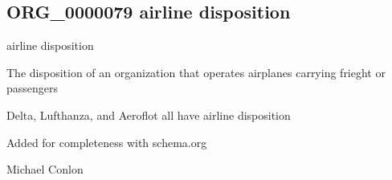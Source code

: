 \documentclass[letterpaper,10pt,english]{sphinxmanual}
\begin{document}
\subsection{ORG\_0000079 \sphinxhyphen{} airline disposition}
\label{\detokenize{doc-ORG_0000079:org-0000079-airline-disposition}}\label{\detokenize{doc-ORG_0000079:index-0}}\label{\detokenize{doc-ORG_0000079::doc}}
\begin{sphinxShadowBox}

\sphinxAtStartPar
airline disposition
\end{sphinxShadowBox}

\begin{sphinxShadowBox}

\sphinxAtStartPar
{\hyperref[\detokenize{doc-BFO_0000016::doc}]{}}
\end{sphinxShadowBox}

\begin{sphinxShadowBox}

\sphinxAtStartPar
The disposition of an organization that operates airplanes carrying frieght or passengers
\end{sphinxShadowBox}

\begin{sphinxShadowBox}

\sphinxAtStartPar
{}
\end{sphinxShadowBox}

\begin{sphinxShadowBox}

\sphinxAtStartPar
Delta, Lufthanza, and Aeroflot all have airline disposition
\end{sphinxShadowBox}

\begin{sphinxShadowBox}

\sphinxAtStartPar
Added for completeness with schema.org
\end{sphinxShadowBox}

\begin{sphinxShadowBox}

\sphinxAtStartPar
Michael Conlon 
\end{sphinxShadowBox}
\begin{quote}

\ignorespaces \end{quote}
\end{document}

